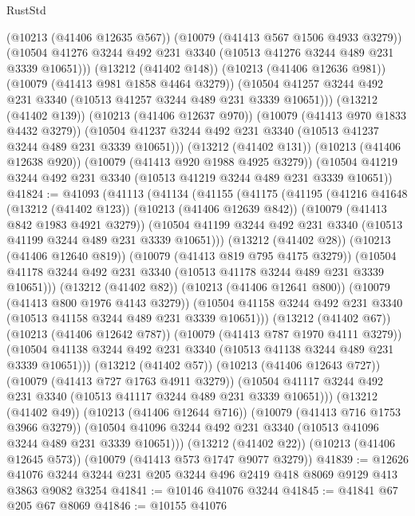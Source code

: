 \begin{lexlean}{RustStd}
\begin{coremodule}
          (@10213 (@41406 @12635 @567))
          (@10079 (@41413 @567 @1506 @4933 @3279))
          (@10504 @41276 @3244 @492 @231 @3340 (@10513 @41276 @3244 @489 @231 @3339 @10651)))
        (@13212 (@41402 @148))
        (@10213 (@41406 @12636 @981))
        (@10079 (@41413 @981 @1858 @4464 @3279))
        (@10504 @41257 @3244 @492 @231 @3340 (@10513 @41257 @3244 @489 @231 @3339 @10651)))
      (@13212 (@41402 @139))
      (@10213 (@41406 @12637 @970))
      (@10079 (@41413 @970 @1833 @4432 @3279))
      (@10504 @41237 @3244 @492 @231 @3340 (@10513 @41237 @3244 @489 @231 @3339 @10651)))
    (@13212 (@41402 @131))
    (@10213 (@41406 @12638 @920))
    (@10079 (@41413 @920 @1988 @4925 @3279))
    (@10504 @41219 @3244 @492 @231 @3340 (@10513 @41219 @3244 @489 @231 @3339 @10651))
@41824 := @41093
    (@41113
      (@41134
        (@41155
          (@41175
            (@41195
              (@41216
                @41648
                (@13212 (@41402 @123))
                (@10213 (@41406 @12639 @842))
                (@10079 (@41413 @842 @1983 @4921 @3279))
                (@10504 @41199 @3244 @492 @231 @3340 (@10513 @41199 @3244 @489 @231 @3339 @10651)))
              (@13212 (@41402 @28))
              (@10213 (@41406 @12640 @819))
              (@10079 (@41413 @819 @795 @4175 @3279))
              (@10504 @41178 @3244 @492 @231 @3340 (@10513 @41178 @3244 @489 @231 @3339 @10651)))
            (@13212 (@41402 @82))
            (@10213 (@41406 @12641 @800))
            (@10079 (@41413 @800 @1976 @4143 @3279))
            (@10504 @41158 @3244 @492 @231 @3340 (@10513 @41158 @3244 @489 @231 @3339 @10651)))
          (@13212 (@41402 @67))
          (@10213 (@41406 @12642 @787))
          (@10079 (@41413 @787 @1970 @4111 @3279))
          (@10504 @41138 @3244 @492 @231 @3340 (@10513 @41138 @3244 @489 @231 @3339 @10651)))
        (@13212 (@41402 @57))
        (@10213 (@41406 @12643 @727))
        (@10079 (@41413 @727 @1763 @4911 @3279))
        (@10504 @41117 @3244 @492 @231 @3340 (@10513 @41117 @3244 @489 @231 @3339 @10651)))
      (@13212 (@41402 @49))
      (@10213 (@41406 @12644 @716))
      (@10079 (@41413 @716 @1753 @3966 @3279))
      (@10504 @41096 @3244 @492 @231 @3340 (@10513 @41096 @3244 @489 @231 @3339 @10651)))
    (@13212 (@41402 @22))
    (@10213 (@41406 @12645 @573))
    (@10079 (@41413 @573 @1747 @9077 @3279))
@41839 := @12626
    @41076
    @3244
    @3244
    @231
    @205
    @3244
    @496
    @2419
    @418
    @8069
    @9129
    @413
    @3863
    @9082
    @3254
@41841 := @10146 @41076 @3244
@41845 := @41841 @67 @205 @67 @8069
@41846 := @10155 @41076

\end{coremodule}
\end{lexlean}
